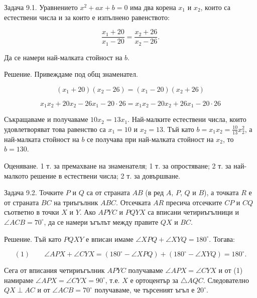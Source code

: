
Задача 9.1. Уравнението $x^2+ax+b=0$ има два корена $x_1$ и $x_2$, които са естествени числа и за които е изпълнено равенството:

$$\frac{x_1+20}{x_1-20}=\frac{x_2+26}{x_2-26}.$$

Да се намери най-малката стойност на $b$.

Решение. Привеждаме под общ знаменател.

$$(x_1+20)(x_2-26)=(x_1-20)(x_2+26)$$

$$x_1x_2+20x_2-26x_1-20\cdot26=x_1x_2-20x_2+26x_1-20\cdot26$$

Съкращаваме и получаваме $10x_2=13x_1$. Най-малките естествени числа, които удовлетворяват това равенство са $x_1=10$ и $x_2=13$. Тъй като $b=x_1x_2=\frac{10}{13}x_2^2$, а най-малката стойност на $b$ се получава при най-малката стойност на $x_2$, то $b=130$.

Оценяване. 1 т. за премахване на знаменателя; 1 т. за опростяване; 2 т. за най-малкото решение в естествени числа; 2 т. за довършване.

Задача 9.2. Точките $P$ и $Q$ са от страната $AB$ (в ред $A$, $P$, $Q$ и $B$), а точката $R$ е от страната $BC$ на триъгълник $ABC$. Отсечката $AR$ пресича отсечките $CP$ и $CQ$ съответно в точки $X$ и $Y$. Ако $APYC$ и $PQYX$ са вписани четириъгълници и $\angle ACB=70^\circ$, да се намери ъгълът между правите $QX$ и $BC$.

Решение. Тъй като $PQXY$ е вписан имаме $\angle XPQ+\angle XYQ=180^\circ$. Тогава:

$$(1)\qquad \angle APX+\angle CYX=(180^\circ-\angle XPQ)+(180^\circ-\angle XYQ)=180^\circ.$$

Сега от вписания четириъгълник $APYC$ получаваме $\angle APX=\angle CYX$ и от (1) намираме $\angle APX=\angle CYX=90^\circ$, т.е. $X$ е ортоцентър за $\triangle AQC$. Следователно $QX\perp AC$ и от $\angle ACB=70^\circ$ получаваме, че търсеният ъгъл е $20^\circ$.

